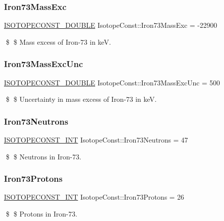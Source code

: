 \subsubsection{\texorpdfstring{Iron73\+Mass\+Exc}{Iron73MassExc}}
{\footnotesize\ttfamily \mbox{\hyperlink{group___isotope_const-_macros_ga8f45a7272ce02c0b4c65c44636ed719a}{I\+S\+O\+T\+O\+P\+E\+C\+O\+N\+S\+T\+\_\+\+D\+O\+U\+B\+LE}} Isotope\+Const\+::\+Iron73\+Mass\+Exc = -\/22900}

\$ \$ Mass excess of Iron-\/73 in keV. \mbox{\label{group___isotope_const-_iron-_fe73_ga1aa5cc3679f67fddbab873278b4eb92e}} 
\subsubsection{\texorpdfstring{Iron73\+Mass\+Exc\+Unc}{Iron73MassExcUnc}}
{\footnotesize\ttfamily \mbox{\hyperlink{group___isotope_const-_macros_ga8f45a7272ce02c0b4c65c44636ed719a}{I\+S\+O\+T\+O\+P\+E\+C\+O\+N\+S\+T\+\_\+\+D\+O\+U\+B\+LE}} Isotope\+Const\+::\+Iron73\+Mass\+Exc\+Unc = 500}

\$ \$ Uncertainty in mass excess of Iron-\/73 in keV. \mbox{\label{group___isotope_const-_iron-_fe73_ga76523f5e93a6e337ef1bfca16d751e33}} 
\subsubsection{\texorpdfstring{Iron73\+Neutrons}{Iron73Neutrons}}
{\footnotesize\ttfamily \mbox{\hyperlink{group___isotope_const-_macros_ga5f18360b3e99483a35c32d789e62621c}{I\+S\+O\+T\+O\+P\+E\+C\+O\+N\+S\+T\+\_\+\+I\+NT}} Isotope\+Const\+::\+Iron73\+Neutrons = 47}

\$ \$ Neutrons in Iron-\/73. \mbox{\label{group___isotope_const-_iron-_fe73_gacd3f0efa4c432b300b2b2544973984c7}} 
\subsubsection{\texorpdfstring{Iron73\+Protons}{Iron73Protons}}
{\footnotesize\ttfamily \mbox{\hyperlink{group___isotope_const-_macros_ga5f18360b3e99483a35c32d789e62621c}{I\+S\+O\+T\+O\+P\+E\+C\+O\+N\+S\+T\+\_\+\+I\+NT}} Isotope\+Const\+::\+Iron73\+Protons = 26}

\$ \$ Protons in Iron-\/73. 